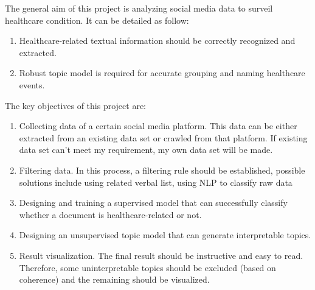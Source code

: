 The general aim of this project is analyzing social media data to surveil healthcare condition. It can be detailed as follow:
\begin{enumerate}
    \item Healthcare-related textual information should be correctly recognized and extracted.
    \item Robust topic model is required for accurate grouping and naming healthcare events.
\end{enumerate}

The key objectives of this project are:

\begin{enumerate}
    \item Collecting data of a certain social media platform. This data can be either extracted from an existing data set or crawled from that platform. If existing data set can’t meet my requirement, my own data set will be made.
    \item Filtering data. In this process, a filtering rule should be established, possible solutions include using related verbal list, using NLP to classify raw data
    \item Designing and training a supervised model that can successfully classify whether a document is healthcare-related or not.
    \item Designing an unsupervised topic model that can generate interpretable topics.
    \item Result visualization. The final result should be instructive and easy to read. Therefore, some uninterpretable topics should be excluded (based on coherence) and the remaining should be visualized.
\end{enumerate}